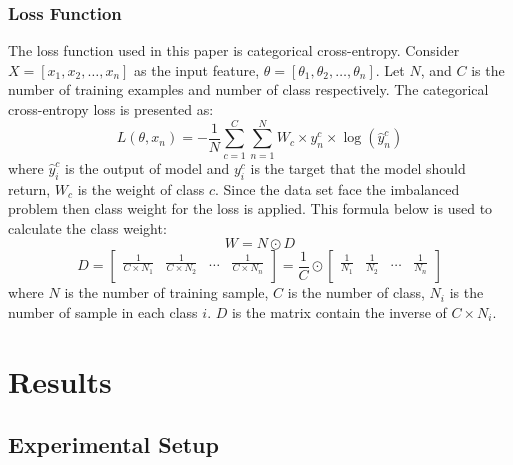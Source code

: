 \documentclass[sensors,article,submit,pdftex,moreauthors]{Definitions/mdpi}
\begin{document}
\subsubsection{Loss Function}
The loss function used in this paper is categorical cross-entropy. Consider $X = [x_1, x_2, \dots, x_n]$ as the input feature, $\theta = [\theta_1, \theta_2, \dots, \theta_n]$. Let $N$, and $C$ is the number of training examples and number of class respectively. The categorical cross-entropy loss is presented as:
\[L(\theta, x_n) = -\frac{1}{N}\sum_{c=1}^{C}\sum_{n=1}^{N}W_c\times y^c_n \times \log(\hat{y}^c_n)\]
where $\hat{y}^c_i$  is the output of model and $y^c_i$ is the target that the model should return, $W_c$ is the weight of class $c$. Since the data set face the imbalanced problem then class weight for the loss is applied. This formula below is used to calculate the class weight:
\[W = N \odot D\]
\[D = \begin{bmatrix}
	\frac{1}{C \times  N_1} & \frac{1}{C \times  N_2} & \dots & \frac{1}{C \times  N_n}\\
\end{bmatrix} = \frac{1}{C} \odot \begin{bmatrix}
	\frac{1}{N_1} & \frac{1}{N_2} & \dots & \frac{1}{N_n}\\
\end{bmatrix}\]
where $N$ is the number of training sample, $C$ is the number of class, $N_i$ is the number of sample in each class $i$. $D$ is the matrix contain the inverse of $C \times N_i$. 

\section{Results}
\subsection{Experimental Setup}
\end{document}
